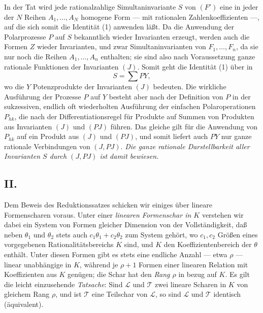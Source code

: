 In der Tat wird jede rationalzahlige Simultaninvariante $S$ von $(F')$ eine in jeder der $N$ Reihen $A_1,\ldots,A_N$ homogene Form --- mit rationalen Zahlenkoeffizienten ---, auf die sich somit die Identität (1) anwenden läßt. Da die Anwendung der Polarprozesse $P$ auf $S$ bekanntlich wieder Invarianten erzeugt, werden auch die Formen $Z$ wieder Invarianten, und zwar Simultaninvarianten von $F_1,
\ldots,F_n$, da sie nur noch die Reihen $A_1,
\ldots,A_n$ enthalten; sie sind also nach Voraussetzung ganze rationale Funktionen der Invarianten $(J)$. Somit geht die Identität (1) über in
\[
  S=\sum PY,
\]
wo die $Y$ Potenzprodukte der Invarianten $(J)$ bedeuten. Die wirkliche Ausführung der Prozesse $P$ auf $Y$ besteht aber nach der Definition von $P$ in der sukzessiven, endlich oft wiederholten Ausführung der einfachen Polaroperationen $P_{hk}$, die nach der Differentiationsregel für Produkte auf Summen von Produkten aus Invarianten $(J)$ und $(PJ)$ führen. Das gleiche gilt für die Anwendung von $P_{hk}$ auf ein Produkt aus $(J)$ und $(PJ)$, und somit liefert auch $PY$ nur ganze rationale Verbindungen von $(J,PJ)$. \emph{Die ganze rationale Darstellbarkeit aller Invarianten $S$ durch $(J,PJ)$ ist damit bewiesen.}

\subsection*{II.}
Dem Beweis des Reduktionssatzes schicken wir einiges über lineare Formenscharen voraus. Unter einer \emph{linearen Formenschar in $K$} verstehen wir dabei ein System von Formen gleicher Dimension von der Vollständigkeit, daß neben $\theta_1$ und $\theta_2$ stets auch $c_1\theta_1+c_2\theta_2$ zum System gehört, wo $c_1,c_2$ Größen eines vorgegebenen Rationalitätsbereichs $K$ sind, und $K$ den Koeffizientenbereich der $\theta$ enthält. Unter diesen Formen gibt es stets eine endliche Anzahl --- etwa $\rho$ --- linear unabhängige in $K$, während je $\rho+1$ Formen einer linearen Relation mit Koeffizienten aus $K$ genügen; die Schar hat den \emph{Rang $\rho$} in bezug auf $K$. Es gilt die leicht einzusehende \emph{Tatsache}: Sind $\mathcal L$ und $\mathcal T$ zwei lineare Scharen in $K$ von gleichem Rang $\rho$, und ist $\mathcal T$ eine Teilschar von $\mathcal L$, so sind $\mathcal L$ und $\mathcal T$ identisch (äquivalent).

